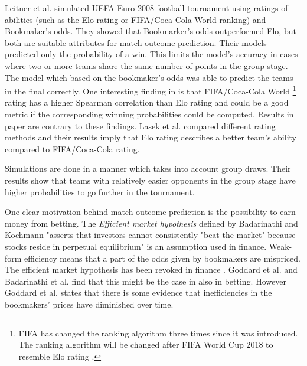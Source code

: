 Leitner et al. \cite{leitner2010forecasting} simulated UEFA Euro 2008 football tournament using ratings of abilities (such as the Elo rating or FIFA/Coca-Cola World ranking) and Bookmaker's odds. They showed that Bookmarker's odds outperformed Elo, but both are suitable attributes for match outcome prediction. Their models predicted only the probability of a win. This limits the model's accuracy in cases where two or more teams share the same number of points in the group stage. The model which based on the bookmaker's odds was able to predict the teams in the final correctly. One interesting finding in \cite{leitner2010forecasting} is that FIFA/Coca-Cola World \footnote{FIFA has changed the ranking algorithm three times since it was introduced. The ranking algorithm will be changed after FIFA World Cup 2018 to resemble Elo rating \cite{wiki:fifarating}.} rating has a higher Spearman correlation than Elo rating and could be a good metric if the corresponding winning probabilities could be computed. Results in paper \cite{lasek2013predictive} are contrary to these findings. Lasek et al. \cite{lasek2013predictive} compared different rating methods and their results imply that Elo rating describes a better team's ability compared to FIFA/Coca-Cola rating.

Simulations \cite{leitner2010forecasting, groll2018prediction} are done in a manner which takes into account group draws. Their results show that teams with relatively easier opponents in the group stage have higher probabilities to go further in the tournament.

One clear motivation behind match outcome prediction is the possibility to earn money from betting. The \textit{Efficient market hypothesis} defined by Badarinathi and Kochmann \cite{badarinathi1996football} "asserts that investors cannot consistently "beat the market" because stocks reside in perpetual equilibrium" is an assumption used in finance. Weak-form efficiency means that a part of the odds given by bookmakers are mispriced. The efficient market hypothesis has been revoked in finance \cite{jegadeesh1993returns}. Goddard et al. and Badarinathi et al. \cite{goddard2003modelling, badarinathi1996football} find that this might be the case in also in betting. However Goddard et al. \cite{goddard2003modelling} states that there is some evidence that inefficiencies in the bookmakers’ prices have diminished over time.
